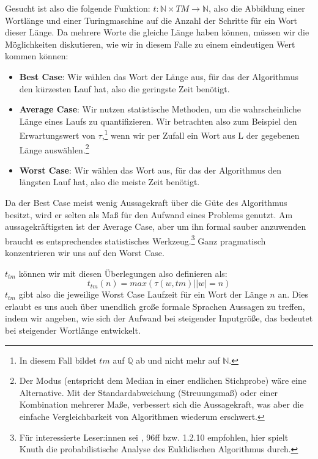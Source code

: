 Gesucht ist also die folgende Funktion:
$t: \mathbb{N} \times TM \rightarrow \mathbb{N}$,
also die Abbildung einer Wortlänge und einer Turingmaschine
auf die Anzahl der Schritte für ein Wort dieser Länge.
Da mehrere Worte die gleiche Länge haben können,
müssen wir die Möglichkeiten diskutieren,
wie wir in diesem Falle zu einem eindeutigen Wert kommen können:
\begin{itemize}
    \item \textbf{Best Case}: Wir wählen das Wort der Länge aus,
        für das der Algorithmus den kürzesten Lauf hat,
        also die geringste Zeit benötigt.
    \item \textbf{Average Case}: Wir nutzen statistische Methoden,
        um die wahrscheinliche Länge eines Laufs zu quantifizieren.
        Wir betrachten also zum Beispiel den Erwartungswert von $\tau$,\footnote{
            In diesem Fall bildet $tm$ auf $\mathbb{Q}$ ab und nicht mehr auf $\mathbb{N}$.}
        wenn wir per Zufall ein Wort aus L der gegebenen Länge auswählen.\footnote{
            Der Modus (entspricht dem Median in einer endlichen Stichprobe) wäre eine Alternative.
        Mit der Standardabweichung (Streuungsmaß) oder einer Kombination mehrerer Maße,
        verbessert sich die Aussagekraft,
        was aber die einfache Vergleichbarkeit von Algorithmen wiederum erschwert.}

    \item \textbf{Worst Case}: Wir wählen das Wort aus,
        für das der Algorithmus den längsten Lauf hat,
        also die meiste Zeit benötigt.
\end{itemize} 

Da der Best Case meist wenig Aussagekraft über die Güte des Algorithmus besitzt,
wird er selten als Maß für den Aufwand eines Problems genutzt.
Am aussagekräftigsten ist der Average Case,
aber um ihn formal sauber anzuwenden braucht es
entsprechendes statistisches Werkzeug.\footnote{
    Für interessierte Leser:innen sei \cite{knuth1}, 96ff bzw. 1.2.10 empfohlen,
    hier spielt Knuth die probabilistische Analyse des Euklidischen Algorithmus durch.} 
Ganz pragmatisch konzentrieren wir uns auf den Worst Case.


$t_{tm}$ können wir mit diesen Überlegungen also definieren als:
\[
t_{tm}(n) = max({\tau(w, tm)| |w| = n})
\]
$t_{tm}$ gibt also die jeweilige Worst Case Laufzeit für ein Wort der Länge $n$ an.
Dies erlaubt es uns auch über unendlich große formale Sprachen Aussagen zu treffen,
indem wir angeben,
wie sich der Aufwand bei steigender Inputgröße,
das bedeutet bei steigender Wortlänge entwickelt.

